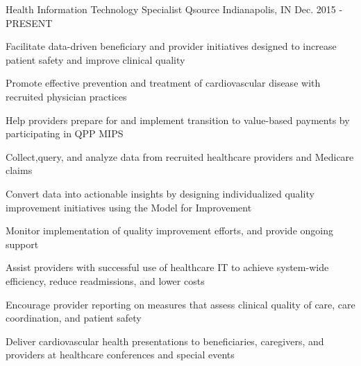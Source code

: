 

\begin{cventries}


  \cventry
    {Health Information Technology Specialist} %
    {Qsource} %
    {Indianapolis, IN} %
    {Dec. 2015 - PRESENT} %
    {
      \begin{cvitems} %
        \item {Facilitate data-driven beneficiary and provider initiatives designed to increase patient safety and improve clinical quality}
        \item {Promote effective prevention and treatment of cardiovascular disease with recruited physician practices}
        \item {Help providers prepare for and implement transition to value-based payments by participating in QPP MIPS}
        \item {Collect,query, and analyze data from recruited healthcare providers and Medicare claims}
        \item {Convert data into actionable insights by designing individualized quality improvement initiatives using the Model for Improvement}
        \item {Monitor implementation of quality improvement efforts, and provide ongoing support}
        \item {Assist providers with successful use of healthcare IT to achieve system-wide efficiency, reduce readmissions, and lower costs}
        \item {Encourage provider reporting on measures that assess clinical quality of care, care coordination, and patient safety}
        \item {Deliver cardiovascular health presentations to beneficiaries, caregivers, and providers at healthcare conferences and special events}
  \end{cvitems}
    }


\end{cventries}
